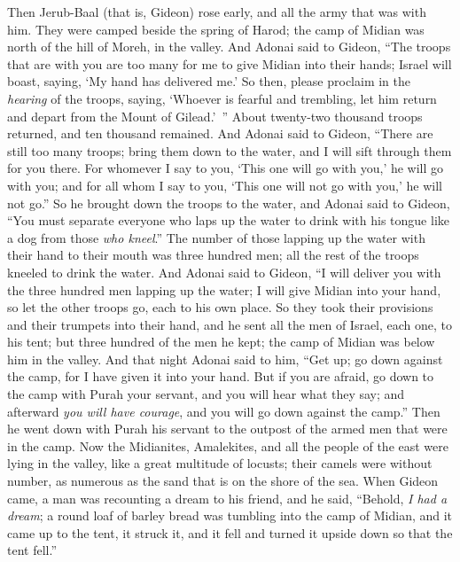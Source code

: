\begin{biblechapter} %
 Then Jerub-Baal (that is, Gideon) rose early, and all the army that was with him. They were camped beside the spring of Harod; the camp of Midian was north of the hill of Moreh, in the valley.
\verse And Adonai said to Gideon, “The troops that are with you are too many for me to give Midian into their hands; Israel will boast, saying, ‘My hand has delivered me.’
\verse So then, please proclaim in the \textit{hearing} of the troops, saying, ‘Whoever is fearful and trembling, let him return and depart from the Mount of Gilead.’ ” About twenty-two thousand troops returned, and ten thousand remained.
\verse And Adonai said to Gideon, “There are still too many troops; bring them down to the water, and I will sift through them for you there. For whomever I say to you, ‘This one will go with you,’ he will go with you; and for all whom I say to you, ‘This one will not go with you,’ he will not go.”
\verse So he brought down the troops to the water, and Adonai said to Gideon, “You must separate everyone who laps up the water to drink with his tongue like a dog from those \textit{who kneel}.”
\verse The number of those lapping up the water with their hand to their mouth was three hundred men; all the rest of the troops kneeled to drink the water.
\verse And Adonai said to Gideon, “I will deliver you with the three hundred men lapping up the water; I will give Midian into your hand, so let the other troops go, each to his own place.
\verse So they took their provisions and their trumpets into their hand, and he sent all the men of Israel, each one, to his tent; but three hundred of the men he kept; the camp of Midian was below him in the valley.
\verse And that night Adonai said to him, “Get up; go down against the camp, for I have given it into your hand.
\verse But if you are afraid, go down to the camp with Purah your servant,
\verse and you will hear what they say; and afterward \textit{you will have courage}, and you will go down against the camp.” Then he went down with Purah his servant to the outpost of the armed men that were in the camp.
\verse Now the Midianites, Amalekites, and all the people of the east were lying in the valley, like a great multitude of locusts; their camels were without number, as numerous as the sand that is on the shore of the sea.
\verse When Gideon came, a man was recounting a dream to his friend, and he said, “Behold, \textit{I had a dream}; a round loaf of barley bread was tumbling into the camp of Midian, and it came up to the tent, it struck it, and it fell and turned it upside down so that the tent fell.”

\end{biblechapter}
